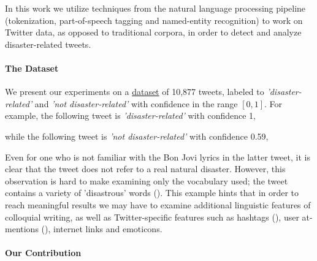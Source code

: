 \documentclass[letterpaper,twocolumn,10pt]{article}
\begin{document}
In this work we utilize techniques from the natural language processing pipeline (tokenization, part-of-speech tagging and named-entity recognition) to work on Twitter data, as opposed to traditional corpora, in order to detect and analyze disaster-related tweets.

\paragraph{The Dataset}
We present our experiments on a \href{https://www.crowdflower.com/data-for-everyone/}{dataset} of 10,877 tweets, labeled to \textit{'disaster-related'} and \textit{'not disaster-related'} with confidence in the range $[0,1]$. For example, the following tweet is \textit{'disaster-related'} with confidence 1,

\begin{center}
	\parbox{190pt}{}
\end{center}


while the following tweet is \textit{'not disaster-related'} with confidence 0.59,

\begin{center}
	\parbox{190pt}{}
\end{center}

Even for one who is not familiar with the Bon Jovi lyrics in the latter tweet, it is clear that the tweet does not refer to a real natural disaster. However, this observation is hard to make examining only the vocabulary used; the tweet contains a variety of 'disastrous' words  (). This example hints that in order to reach meaningful results we may have to examine additional linguistic features of colloquial writing,  as well as Twitter-specific features such as hashtags (\tweet{\textbf{\#}}), user at-mentions (), internet links and emoticons.


\paragraph{Our Contribution}
\end{document}
